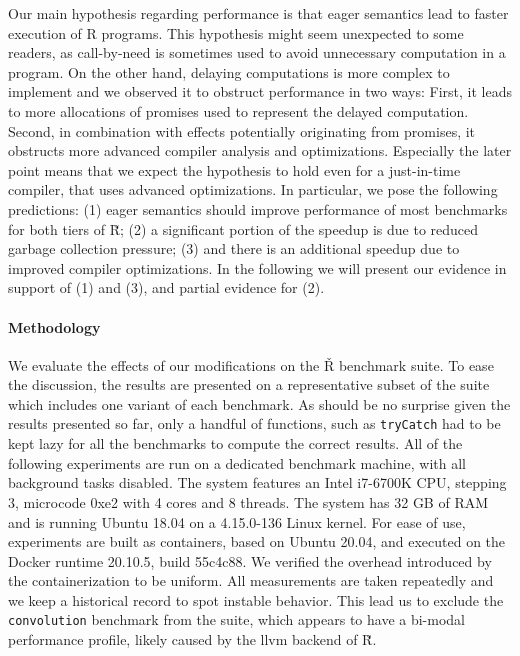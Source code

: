 \documentclass[review,nonacm,screen,acmsmall,anonymous=true]{acmart}
\renewcommand{\Rsh}{{\sf\u R}\xspace}
\begin{document}
Our main hypothesis regarding performance is that eager semantics lead to faster
execution of R programs. This hypothesis might seem unexpected to some readers,
as call-by-need is sometimes used to avoid unnecessary computation in a program.
On the other hand, delaying computations is more complex to implement and we
observed it to obstruct performance in two ways: First, it leads to more
allocations of promises used to represent the delayed computation. Second, in
combination with effects potentially originating from promises, it obstructs
more advanced compiler analysis and optimizations. Especially the later point
means that we expect the hypothesis to hold even for a just-in-time compiler,
that uses advanced optimizations.
In particular, we pose the following predictions:
(1) eager semantics should improve performance of most benchmarks for both tiers
of \Rsh; (2) a significant portion of the speedup is due to reduced garbage
collection pressure; (3) and there is an additional speedup due to improved compiler
optimizations. In the following we will present our evidence in support of (1)
and (3), and partial evidence for (2).

\paragraph{Methodology}

We evaluate the effects of our modifications on the Ř benchmark suite.
To ease the discussion, the results are presented on a representative subset of
the suite which includes one variant of
each benchmark. As should be no surprise given the results presented so far,
only a handful of functions, such as
\lstinline{tryCatch} had to be kept lazy for all the benchmarks to compute
the correct results.
All of the following experiments are run on a dedicated benchmark machine, with
all background tasks disabled. The system features an Intel i7-6700K CPU, stepping 3,
microcode 0xe2 with 4 cores and 8 threads. The system has 32 GB of RAM and is
running Ubuntu 18.04 on a 4.15.0-136 Linux kernel. For ease of use, experiments
are built as containers, based on Ubuntu 20.04, and executed on
the Docker runtime 20.10.5, build 55c4c88. We verified the overhead introduced by
the containerization to be uniform. All measurements are taken repeatedly and we
keep a historical record to spot instable behavior. This lead us to exclude the
\lstinline{convolution} benchmark from the suite, which appears to have a
bi-modal performance profile, likely caused by the llvm backend of \Rsh.
\end{document}
